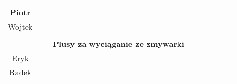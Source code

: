 \documentclass[a4paper, 11pt]{article}
\begin{document}
\begin{table}[ht]
\begin{tabular}{|c|c|c|c|c|c|c|c|c|c|c|c|c|c|c|c|c|c|c|c|c|c|c|c|c|c|c|c|c|c|}
\hline
\multicolumn{5}{|p{3cm}||}{Piotr} & \multicolumn{1}{|p{2,6mm}|}{} & \multicolumn{1}{|p{2,6mm}|}{} & \multicolumn{1}{|p{2,6mm}|}{} & \multicolumn{1}{|p{2,6mm}|}{} & & \multicolumn{1}{||p{2,6mm}|}{} & \multicolumn{1}{|p{2,6mm}|}{} & \multicolumn{1}{|p{2,6mm}|}{} & \multicolumn{1}{|p{2,6mm}|}{} & & \multicolumn{1}{||p{2,6mm}|}{} & \multicolumn{1}{|p{2,6mm}|}{} & \multicolumn{1}{|p{2,6mm}|}{} & \multicolumn{1}{|p{2,6mm}|}{} & & \multicolumn{1}{||p{2,6mm}|}{} & \multicolumn{1}{|p{2,6mm}|}{} & \multicolumn{1}{|p{2,6mm}|}{} & \multicolumn{1}{|p{2,6mm}|}{} & &\multicolumn{1}{||p{2,6mm}|}{} & \multicolumn{1}{|p{2,6mm}|}{} & \multicolumn{1}{|p{2,6mm}|}{} & \multicolumn{1}{|p{2,6mm}|}{} &\\
\hline
\multicolumn{5}{|p{3cm}||}{Wojtek} & \multicolumn{1}{|p{2,6mm}|}{} & \multicolumn{1}{|p{2,6mm}|}{} & \multicolumn{1}{|p{2,6mm}|}{} & \multicolumn{1}{|p{2,6mm}|}{} & & \multicolumn{1}{||p{2,6mm}|}{} & \multicolumn{1}{|p{2,6mm}|}{} & \multicolumn{1}{|p{2,6mm}|}{} & \multicolumn{1}{|p{2,6mm}|}{} & & \multicolumn{1}{||p{2,6mm}|}{} & \multicolumn{1}{|p{2,6mm}|}{} & \multicolumn{1}{|p{2,6mm}|}{} & \multicolumn{1}{|p{2,6mm}|}{} & & \multicolumn{1}{||p{2,6mm}|}{} & \multicolumn{1}{|p{2,6mm}|}{} & \multicolumn{1}{|p{2,6mm}|}{} & \multicolumn{1}{|p{2,6mm}|}{} & &\multicolumn{1}{||p{2,6mm}|}{} & \multicolumn{1}{|p{2,6mm}|}{} & \multicolumn{1}{|p{2,6mm}|}{} & \multicolumn{1}{|p{2,6mm}|}{} &\\
\hline
\multicolumn{30}{p{18cm}}{}\\
\hline
 \multicolumn{30}{|p{18cm}|}{\centering\textbf{Plusy za wyciąganie ze zmywarki}}\\
\hline
\multicolumn{5}{|p{3cm}||}{Eryk} & \multicolumn{1}{|p{2,6mm}|}{} & \multicolumn{1}{|p{2,6mm}|}{} & \multicolumn{1}{|p{2,6mm}|}{} & \multicolumn{1}{|p{2,6mm}|}{} & & \multicolumn{1}{||p{2,6mm}|}{} & \multicolumn{1}{|p{2,6mm}|}{} & \multicolumn{1}{|p{2,6mm}|}{} & \multicolumn{1}{|p{2,6mm}|}{} & & \multicolumn{1}{||p{2,6mm}|}{} & \multicolumn{1}{|p{2,6mm}|}{} & \multicolumn{1}{|p{2,6mm}|}{} & \multicolumn{1}{|p{2,6mm}|}{} & & \multicolumn{1}{||p{2,6mm}|}{} & \multicolumn{1}{|p{2,6mm}|}{} & \multicolumn{1}{|p{2,6mm}|}{} & \multicolumn{1}{|p{2,6mm}|}{} & &\multicolumn{1}{||p{2,6mm}|}{} & \multicolumn{1}{|p{2,6mm}|}{} & \multicolumn{1}{|p{2,6mm}|}{} & \multicolumn{1}{|p{2,6mm}|}{} &\\
\hline
\multicolumn{5}{|p{3cm}||}{Radek} & \multicolumn{1}{|p{2,6mm}|}{} & \multicolumn{1}{|p{2,6mm}|}{} & \multicolumn{1}{|p{2,6mm}|}{} & \multicolumn{1}{|p{2,6mm}|}{} & & \multicolumn{1}{||p{2,6mm}|}{} & \multicolumn{1}{|p{2,6mm}|}{} & \multicolumn{1}{|p{2,6mm}|}{} & \multicolumn{1}{|p{2,6mm}|}{} & & \multicolumn{1}{||p{2,6mm}|}{} & \multicolumn{1}{|p{2,6mm}|}{} & \multicolumn{1}{|p{2,6mm}|}{} & \multicolumn{1}{|p{2,6mm}|}{} & & \multicolumn{1}{||p{2,6mm}|}{} & \multicolumn{1}{|p{2,6mm}|}{} & \multicolumn{1}{|p{2,6mm}|}{} & \multicolumn{1}{|p{2,6mm}|}{} & &\multicolumn{1}{||p{2,6mm}|}{} & \multicolumn{1}{|p{2,6mm}|}{} & \multicolumn{1}{|p{2,6mm}|}{} & \multicolumn{1}{|p{2,6mm}|}{} &\\

\end{tabular}
\end{table}
\end{document}
